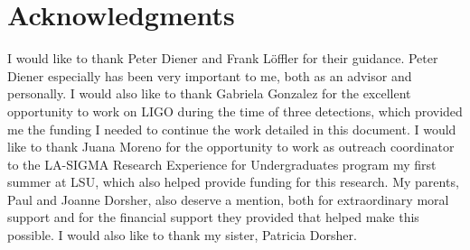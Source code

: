 \documentclass[12pt,letterpaper]{lsuetd}
\begin{document}

\chapter*{Acknowledgments}
\doublespacing
\vspace{0.55ex}
I would like to thank Peter Diener and Frank L\"{o}ffler for their guidance. Peter Diener especially has been very important to me, both as an advisor and personally. I would also like to thank Gabriela Gonzalez for the excellent opportunity to work on LIGO during the time of three detections, which provided me the funding I needed to continue the work detailed in this document. I would like to thank Juana Moreno for the opportunity to work as outreach coordinator to the LA-SIGMA Research Experience for Undergraduates program my first summer at LSU, which also helped provide funding for this research. My parents, Paul and Joanne Dorsher, also deserve a mention, both for extraordinary moral support and for the financial support they provided that helped make this possible. I would also like to thank my sister, Patricia Dorsher. 

\pagebreak


\singlespacing
\tableofcontents
\pagebreak
\end{document}
